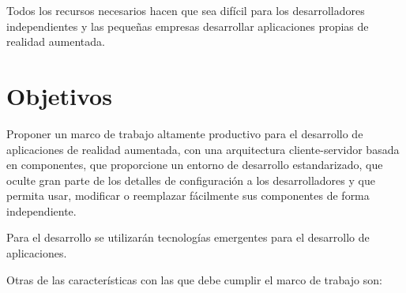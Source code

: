 \documentclass[12pt,a4paper,spanish,openany]{book}
\begin{document}
Todos los recursos necesarios hacen que sea difícil para los desarrolladores
independientes y las pequeñas empresas desarrollar aplicaciones propias de
realidad aumentada.



\section{Objetivos}

Proponer un marco de trabajo altamente productivo para el desarrollo de
aplicaciones de realidad aumentada, con una arquitectura cliente-servidor basada
en componentes, que proporcione un entorno de desarrollo estandarizado, que
oculte gran parte de los detalles de configuración a los desarrolladores y que
permita usar, modificar o reemplazar fácilmente sus componentes de forma
independiente.

Para el desarrollo se utilizarán tecnologías emergentes para el desarrollo de
aplicaciones.


Otras de las características con las que debe cumplir el marco de trabajo son:
\end{document}

